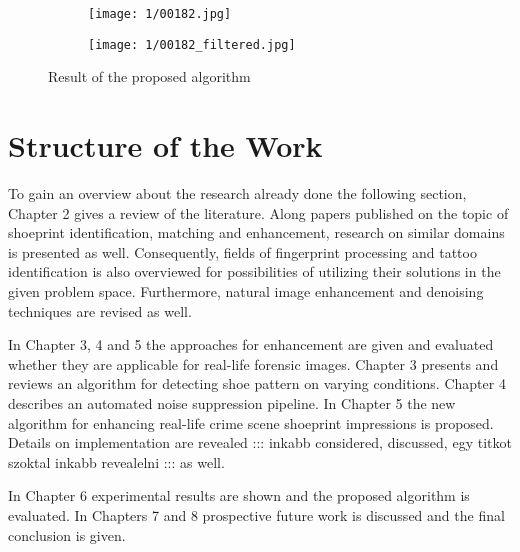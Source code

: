 \documentclass[draft,final]{vutinfth} %
\begin{document}
\begin{figure}[h]
  \centering
  \begin{subfigure}[b]{0.45\columnwidth}
    \centering
    \texttt{[image: 1/00182.jpg]}
    \label{fig:intro:orig}
  \end{subfigure}
  \begin{subfigure}[b]{0.45\columnwidth}
    \centering
    \texttt{[image: 1/00182\_filtered.jpg]}
    \label{fig:intro:enhanced}
  \end{subfigure}
  \caption{Result of the proposed algorithm}
  \label{fig:example}
\end{figure}

\section{Structure of the Work}
\par
To gain an overview about the research already done the following section, Chapter 2 gives a review of the literature. 
Along papers published on the topic of shoeprint identification, matching and enhancement, research on similar domains is presented as well.
Consequently, fields of fingerprint processing and tattoo identification is also overviewed for possibilities of utilizing their solutions in the given problem space.
Furthermore, natural image enhancement and denoising techniques are revised as well.
\par
In Chapter 3, 4 and 5 the approaches for enhancement are given and evaluated whether they are applicable for real-life forensic images.
Chapter 3 presents and reviews an algorithm for detecting shoe pattern on varying conditions.
Chapter 4 describes an automated noise suppression pipeline.
In Chapter 5 the new algorithm for enhancing real-life crime scene shoeprint impressions is proposed.
Details on implementation are revealed ::: inkabb considered, discussed, egy titkot szoktal inkabb revealelni ::: as well.
\par
In Chapter 6 experimental results are shown and the proposed algorithm is evaluated.
In Chapters 7 and 8 prospective future work is discussed and the final conclusion is given. 
\end{document}
